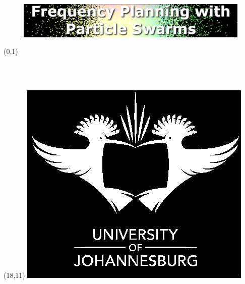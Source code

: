 \documentclass[portrait, a0]{a0poster}
\begin{document}
\begin{figure}
    \centering
	\includegraphics{pics/Title.png}
\end{figure}

\begin{textblock}{26}(0,1)
 \begin{center}
   \Large{\textcolor{white}{W. Bezuidenhout, G.B O'Reilly}} \\
   \Large{\textcolor{white}{University of Johannesburg}} \\
 \end{center}
\end{textblock}

\begin{textblock}{8}(18,11)
\centering
\includegraphics{pics/ujlogowb.png}
\end{textblock}
\end{document}
